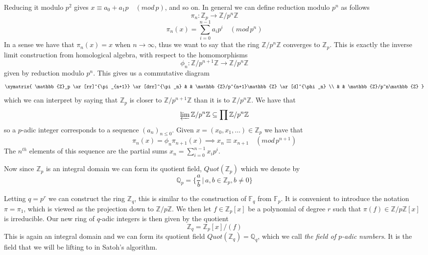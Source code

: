 Reducing it modulo $p^2$ gives $x \equiv a_0 + a_1p \quad (mod\, p)$, and so on. In general
we can define reduction modulo $p^n$ as follows
$$\pi_n: \mathbb{Z}_p \rightarrow \mathbb{Z}/p^n\mathbb{Z}$$
$$\pi_n(x) = \sum_{i=0}^{n-1} a_i p^i \quad (mod\, p^n) $$
In a sense we have that $\pi_n(x) = x$ when $n \rightarrow \infty$, thus we want to say that the ring
$\mathbb{Z}/p^n\mathbb{Z}$ converges to $\mathbb{Z}_p$. This is exactly the inverse
limit construction from homological algebra, with respect to the homomorphisms
$$\phi_n: \mathbb{Z}/p^{n+1}\mathbb{Z} \rightarrow \mathbb{Z}/p^n\mathbb{Z} $$
given by reduction modulo $p^n$. This gives us a commutative diagram
$$
\xymatrix {
  \mathbb{Z}_p \ar[rr]^{\pi_{n+1}} \ar[drr]^{\pi_n} & & \mathbb{Z}/p^{n+1}\mathbb{Z} \ar[d]^{\phi_n} \\
  & & \mathbb{Z}/p^n\mathbb{Z}
}
$$
which we can interpret by saying that $\mathbb{Z}_p$ is closer to $\mathbb{Z}/p^{n+1}\mathbb{Z}$ than it is to
$\mathbb{Z}/p^n\mathbb{Z}$. We have that
$$\varprojlim \mathbb{Z}/p^n\mathbb{Z} \subseteq \prod \mathbb{Z}/p^n\mathbb{Z}$$ so a $p$-adic
integer corresponds to a sequence $(a_n)_{n\leq0}$.
Given $x=(x_0, x_1, \ldots) \in \mathbb{Z}_p$ we have that 
$$\pi_n(x) = \phi_n\pi_{n+1}(x) \implies x_n \equiv x_{n+1} \quad (mod\, p^{n+1})$$
The $n^{th}$ elements of this sequence are the partial sums $x_n = \sum_{i=0}^{n-1} x_i p^i$.

Now since $\mathbb{Z}_p$ is an integral domain we can form its quotient field, $Quot(\mathbb{Z}_p)$
which we denote by
$$\mathbb{Q}_p = \{\frac{a}{b}\, |\, a,b \in \mathbb{Z}_p, b\neq 0\}$$ 

Letting $q=p^r$ we can construct the ring $\mathbb{Z}_q$, this is similar to the construction
of $\mathbb{F}_q$ from $\mathbb{F}_p$. It is convenient to introduce the notation
$\pi=\pi_1$, which is viewed as the projection down to $\mathbb{Z}/p\mathbb{Z}$.
We then let $f \in \mathbb{Z}_p[x]$ be a polynomial
of degree $r$ such that $\pi(f) \in \mathbb{Z}/p\mathbb{Z}[x]$ is irreducible.
Our new ring of $q$-adic integers is then given by the quotient
$$\mathbb{Z}_q = \mathbb{Z}_p[x]/(f) $$
This is again an integral domain  and we can form its quotient field $Quot(\mathbb{Z}_q) = \mathbb{Q}_q$,
which we call \emph{the field of $p$-adic numbers}. It is the field that we will
be lifting to in Satoh's algorithm.
